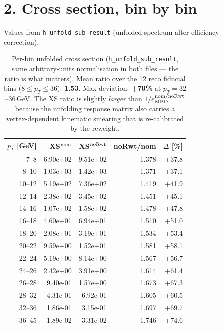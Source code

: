 \documentclass[11pt,a4paper]{article}
\begin{document}
\section*{2. Cross section, bin by bin}
\vspace{-0.5em}

Values from \texttt{h\_unfold\_sub\_result} (unfolded spectrum after efficiency correction).

\begin{table}[H]
\centering\small
\begin{tabular}{rrrrr}
\toprule
$p_T$ [GeV] & XS$^{\rm nom}$ & XS$^{\rm noRwt}$ & noRwt/nom & $\Delta$ [\%] \\
\midrule
  7--8    & 6.90e+02 & 9.51e+02 & 1.378 & +37.8 \\
  8--10   & 1.03e+03 & 1.42e+03 & 1.371 & +37.1 \\
 10--12   & 5.19e+02 & 7.36e+02 & 1.419 & +41.9 \\
 12--14   & 2.38e+02 & 3.45e+02 & 1.451 & +45.1 \\
 14--16   & 1.07e+02 & 1.58e+02 & 1.478 & +47.8 \\
 16--18   & 4.60e+01 & 6.94e+01 & 1.510 & +51.0 \\
 18--20   & 2.08e+01 & 3.19e+01 & 1.534 & +53.4 \\
 20--22   & 9.59e+00 & 1.52e+01 & 1.581 & +58.1 \\
 22--24   & 5.19e+00 & 8.14e+00 & 1.567 & +56.7 \\
 24--26   & 2.42e+00 & 3.91e+00 & 1.614 & +61.4 \\
 26--28   & 9.40e-01 & 1.57e+00 & 1.673 & +67.3 \\
 28--32   & 4.31e-01 & 6.92e-01 & 1.605 & +60.5 \\
 32--36   & 1.86e-01 & 3.15e-01 & 1.697 & +69.7 \\
 36--45   & 1.89e-02 & 3.31e-02 & 1.746 & +74.6 \\
\bottomrule
\end{tabular}
\caption{Per-bin unfolded cross section (\texttt{h\_unfold\_sub\_result}, same arbitrary-units normalisation in both files --- the ratio is what matters). Mean ratio over the 12 reco fiducial bins ($8 \le p_T \le 36$): \textbf{1.53}. Max deviation: \textbf{+70\%} at $p_T = 32$--$36$\,GeV. The XS ratio is slightly \emph{larger} than $1/\varepsilon_{\rm MBD}^{\rm nom/noRwt}$ because the unfolding response matrix also carries a vertex-dependent kinematic smearing that is re-calibrated by the reweight.}
\label{tab:xs}
\end{table}
\end{document}
